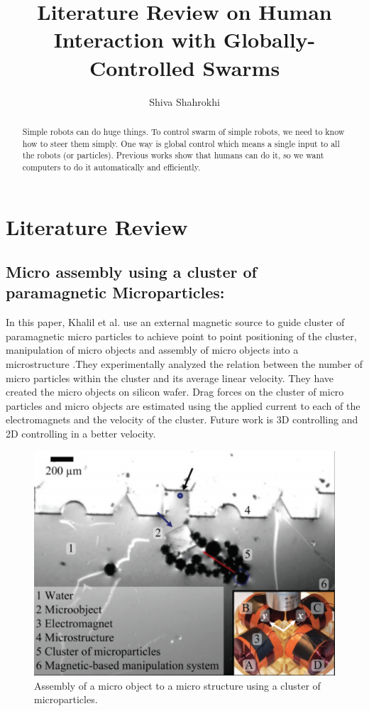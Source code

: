 \documentclass[letterpaper, 10 pt, conference]{ieeeconf}
\begin{document}
\author{Shiva Shahrokhi}
\title{Literature Review on Human Interaction with Globally-Controlled Swarms}
\maketitle

\begin{abstract}

Simple robots can do huge things. To control swarm of simple robots, we need to know how to steer them simply. One way is global control which means a single input to all the robots (or particles). Previous works show that humans can do it, so we want computers to do it automatically and efficiently.
 
\end{abstract}

\section{Literature Review}
\subsection{Micro assembly using a cluster of paramagnetic Microparticles:}

In this paper, Khalil et al. use an external magnetic source to guide cluster of paramagnetic micro particles to achieve point to point positioning of the cluster, manipulation of micro objects and assembly of micro objects into a microstructure \cite{Khalil2013}.They experimentally analyzed the relation between the number of micro particles within the cluster and its average linear velocity. They have created the micro objects on silicon wafer. Drag forces on the cluster of micro particles and micro objects are estimated using the applied current to each of the electromagnets and the velocity of the cluster. Future work is 3D controlling and 2D controlling in a better velocity.
\begin{figure}[h]
\begin{center}
\includegraphics[width=\columnwidth]{khalil.png}
\caption{Assembly of a micro object to a micro structure using a cluster of microparticles.\cite{Khalil2013}
\label{fig:khalil}}
\end{center}
\end{figure}
\end{document}
